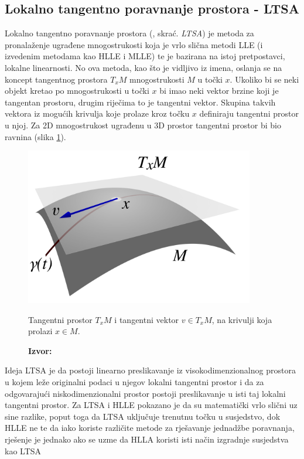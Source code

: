 \documentclass[times, utf8, diplomski]{fer}
\newcommand*{\captionsource}[2]{            %
    \RawFloats
    \caption{#1}
    \caption*{\textbf{Izvor:} #2}
}
\begin{document}
\subsection{Lokalno tangentno poravnanje prostora - LTSA}

Lokalno tangentno poravnanje prostora (, skrać. \emph{LTSA}) je metoda za pronalaženje ugrađene mnogostrukosti koja je vrlo slična metodi LLE (i izvedenim metodama kao HLLE i MLLE) te je bazirana na istoj pretpostavci, lokalne linearnosti. No ova metoda, kao što je vidljivo iz imena, oslanja se na koncept tangentnog prostora $T_xM$ mnogostrukosti $M$ u točki $x$. Ukoliko bi se neki objekt kretao po mnogostrukosti u točki $x$ bi imao neki vektor brzine koji je tangentan prostoru, drugim riječima to je tangentni vektor. Skupina takvih vektora iz mogućih krivulja koje prolaze kroz točku $x$ definiraju tangentni prostor u njoj. Za 2D mnogostrukost ugrađenu u 3D prostor tangentni prostor bi bio ravnina (slika \ref{fig:tanget_space}).

\bigskip
\begin{figure}[htb]
    \centering
    \includegraphics[width=10cm]{resources/images/reduction/tanget_space.png}
    \captionsource{Tangentni prostor $T_{x}M$ i tangentni vektor $v \in T_{x}M$, na krivulji koja prolazi $ x \in M$.}{\cite{wikimedia2008tangent}}
    \label{fig:tanget_space}
\end{figure}
\bigskip

Ideja LTSA je da postoji linearno preslikavanje iz visokodimenzionalnog prostora u kojem leže originalni podaci u njegov lokalni tangentni prostor i da za odgovarajući niskodimenzionalni prostor postoji preslikavanje u isti taj lokalni tangentni prostor. Za LTSA i HLLE pokazano je da su matematički vrlo slični uz sine razlike, poput toga da LTSA uključuje trenutnu točku u susjedstvo, dok HLLE ne te da iako koriste različite metode za rješavanje jednadžbe poravnanja, rješenje je jednako ako se uzme da HLLA koristi isti način izgradnje susjedstva kao LTSA \citep{7837655}
\end{document}
